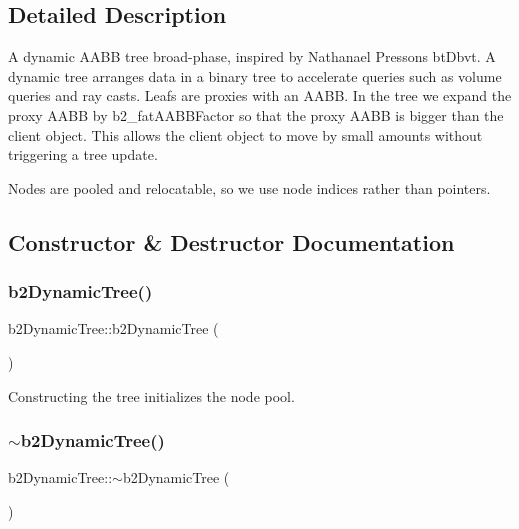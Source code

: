\subsection{Detailed Description}
A dynamic A\+A\+BB tree broad-\/phase, inspired by Nathanael Presson\textquotesingle{}s bt\+Dbvt. A dynamic tree arranges data in a binary tree to accelerate queries such as volume queries and ray casts. Leafs are proxies with an A\+A\+BB. In the tree we expand the proxy A\+A\+BB by b2\+\_\+fat\+A\+A\+B\+B\+Factor so that the proxy A\+A\+BB is bigger than the client object. This allows the client object to move by small amounts without triggering a tree update.

Nodes are pooled and relocatable, so we use node indices rather than pointers. 

\subsection{Constructor \& Destructor Documentation}
\mbox{\label{classb2_dynamic_tree_a8af64cf6a1566fa4c5b5c9683bd937d9}} 
\subsubsection{\texorpdfstring{b2DynamicTree()}{b2DynamicTree()}}
{\footnotesize\ttfamily b2\+Dynamic\+Tree\+::b2\+Dynamic\+Tree (\begin{DoxyParamCaption}{ }\end{DoxyParamCaption})}



Constructing the tree initializes the node pool. 

\mbox{\label{classb2_dynamic_tree_a9060565fc63b4dd87d9560775c076786}} 
\subsubsection{\texorpdfstring{$\sim$b2DynamicTree()}{~b2DynamicTree()}}
{\footnotesize\ttfamily b2\+Dynamic\+Tree\+::$\sim$b2\+Dynamic\+Tree (\begin{DoxyParamCaption}{ }\end{DoxyParamCaption})}



